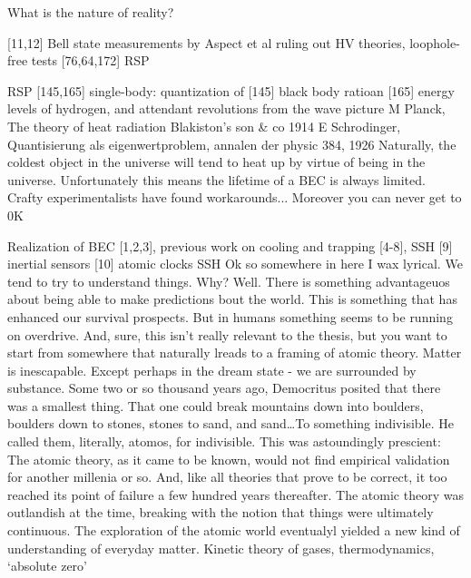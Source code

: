 
What is the nature of reality?



[11,12] Bell state measurements by Aspect et al ruling out HV theories, loophole-free tests [76,64,172] RSP


RSP [145,165] single-body: quantization of [145] black body ratioan [165] energy levels of hydrogen, and attendant revolutions from the wave picture  
		M Planck, The theory of heat radiation Blakiston's son \& co 1914
		E Schrodinger, Quantisierung als eigenwertproblem, annalen der physic 384, 1926
Naturally, the coldest object in the universe will tend to heat up by virtue of being in the universe. Unfortunately this means the lifetime of a BEC is always limited. Crafty experimentalists have found workarounds...
Moreover you can never get to 0K

Realization of BEC [1,2,3], previous work on cooling and trapping [4-8], SSH 
		[9] inertial sensors [10] atomic clocks SSH
Ok so somewhere in here I wax lyrical. We tend to try to understand
things. Why? Well. There is something advantageuos about being able to
make predictions bout the world. This is something that has enhanced our
survival prospects. But in humans something seems to be running on
overdrive. And, sure, this isn't really relevant to the thesis, but you
want to start from somewhere that naturally lreads to a framing of
atomic theory. Matter is inescapable. Except perhaps in the dream state
- we are surrounded by substance. Some two or so thousand years ago,
Democritus posited that there was a smallest thing. That one could break
mountains down into boulders, boulders down to stones, stones to sand,
and sand\ldots To something indivisible. He called them, literally,
atomos, for indivisible. This was astoundingly prescient: The atomic
theory, as it came to be known, would not find empirical validation for
another millenia or so. And, like all theories that prove to be correct,
it too reached its point of failure a few hundred years thereafter. The
atomic theory was outlandish at the time, breaking with the notion that
things were ultimately continuous. The exploration of the atomic world
eventualyl yielded a new kind of understanding of everyday matter.
Kinetic theory of gases, thermodynamics, `absolute zero'


